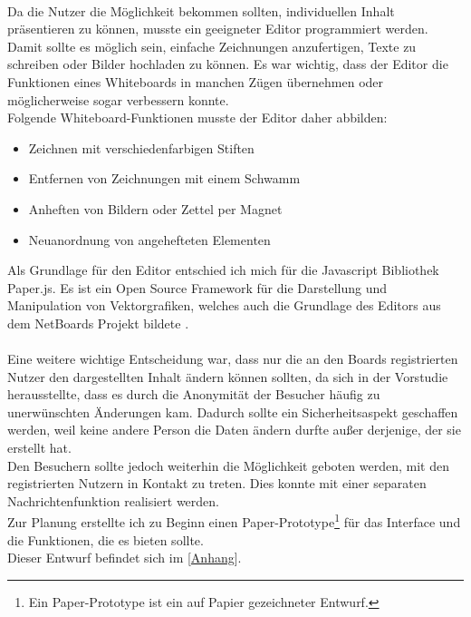 \\
Da die Nutzer die Möglichkeit bekommen sollten, individuellen Inhalt präsentieren zu können, musste ein geeigneter Editor programmiert werden.
Damit sollte es möglich sein, einfache Zeichnungen anzufertigen, Texte zu schreiben oder Bilder hochladen zu können.
Es war wichtig, dass der Editor die Funktionen eines Whiteboards in manchen Zügen übernehmen oder möglicherweise sogar verbessern konnte.
\\
Folgende Whiteboard-Funktionen musste der Editor daher abbilden:
\begin{itemize}
  \item Zeichnen mit verschiedenfarbigen Stiften
  \item Entfernen von Zeichnungen mit einem Schwamm
  \item Anheften von Bildern oder Zettel per Magnet
  \item Neuanordnung von angehefteten Elementen
\end{itemize}
Als Grundlage für den Editor entschied ich mich für die Javascript Bibliothek Paper.js.
Es ist ein Open Source Framework für die Darstellung und Manipulation von Vektorgrafiken, welches auch die Grundlage des Editors aus dem NetBoards Projekt bildete \cite{wood:2014}.
\\
\\
Eine weitere wichtige Entscheidung war, dass nur die an den Boards registrierten Nutzer den dargestellten Inhalt ändern können sollten, da sich in der Vorstudie herausstellte, dass es durch die Anonymität der Besucher häufig zu unerwünschten Änderungen kam.
Dadurch sollte ein Sicherheitsaspekt geschaffen werden, weil keine andere Person die Daten ändern durfte außer derjenige, der sie erstellt hat.
\\
Den Besuchern sollte jedoch weiterhin die Möglichkeit geboten werden, mit den registrierten Nutzern in Kontakt zu treten. Dies konnte mit einer separaten Nachrichtenfunktion realisiert werden.
\\
Zur Planung erstellte ich zu Beginn einen Paper-Prototype\footnote{Ein Paper-Prototype ist ein auf Papier gezeichneter Entwurf.} für das Interface und die Funktionen, die es bieten sollte.
\\
Dieser Entwurf befindet sich im [\hyperref[paperPrototype]{Anhang}].










